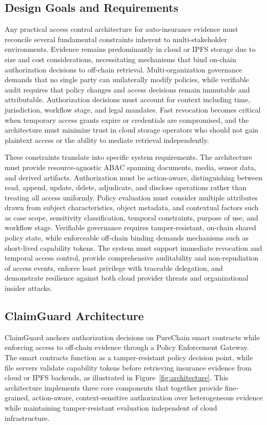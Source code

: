 \documentclass[final,5p,times,twocolumn]{elsarticle}
\begin{document}
\subsection{Design Goals and Requirements}

Any practical access control architecture for auto-insurance evidence must reconcile several fundamental constraints inherent to multi-stakeholder environments. Evidence remains predominantly in cloud or IPFS storage due to size and cost considerations, necessitating mechanisms that bind on-chain authorization decisions to off-chain retrieval. Multi-organization governance demands that no single party can unilaterally modify policies, while verifiable audit requires that policy changes and access decisions remain immutable and attributable. Authorization decisions must account for context including time, jurisdiction, workflow stage, and legal mandates. Fast revocation becomes critical when temporary access grants expire or credentials are compromised, and the architecture must minimize trust in cloud storage operators who should not gain plaintext access or the ability to mediate retrieval independently.

These constraints translate into specific system requirements. The architecture must provide resource-agnostic ABAC spanning documents, media, sensor data, and derived artifacts. Authorization must be action-aware, distinguishing between read, append, update, delete, adjudicate, and disclose operations rather than treating all access uniformly. Policy evaluation must consider multiple attributes drawn from subject characteristics, object metadata, and contextual factors such as case scope, sensitivity classification, temporal constraints, purpose of use, and workflow stage. Verifiable governance requires tamper-resistant, on-chain shared policy state, while enforceable off-chain binding demands mechanisms such as short-lived capability tokens. The system must support immediate revocation and temporal access control, provide comprehensive auditability and non-repudiation of access events, enforce least privilege with traceable delegation, and demonstrate resilience against both cloud provider threats and organizational insider attacks.

\subsection{ClaimGuard Architecture}
\label{sec:architecture}

ClaimGuard anchors authorization decisions on PureChain smart contracts while enforcing access to off-chain evidence through a Policy Enforcement Gateway. The smart contracts function as a tamper-resistant policy decision point, while file servers validate capability tokens before retrieving insurance evidence from cloud or IPFS backends, as illustrated in Figure~\ref{fig:architecture}. This architecture implements three core components that together provide fine-grained, action-aware, context-sensitive authorization over heterogeneous evidence while maintaining tamper-resistant evaluation independent of cloud infrastructure.
\end{document}
